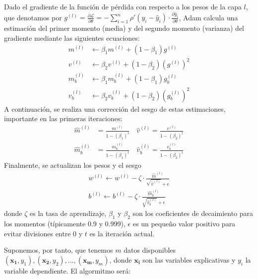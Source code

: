 \documentclass[11pt]{book}
\theoremstyle{plain} %
\theoremstyle{definition} %
\begin{document}
Dado el gradiente de la función de pérdida con respecto a los pesos de la capa $l$, que denotamos 
por $g^{(l)} = \frac{\partial \mathcal{L}}{\partial \theta}= -\sum_{i=1}^n \rho'\left(y_i - \hat{y}_i\right) \cdot \frac{\partial \hat{y}_i}{\partial \theta}$, 
Adam calcula una estimación del primer momento (media) y  del segundo momento  (varianza) del 
gradiente mediante las siguientes ecuaciones:
\begin{align*}
   m^{(l)} &\gets \beta_1 m^{(l)} + (1 - \beta_1) g^{(l)} \\
   v^{(l)} &\gets \beta_2 v^{(l)} + (1 - \beta_2) (g^{(l)})^2\\
   m_b^{(l)} &\gets \beta_1 m_b^{(l)} + (1 - \beta_1) g_b^{(l)} \\
v_b^{(l)} &\gets \beta_2 v_b^{(l)} + (1 - \beta_2) (g_b^{(l)})^2 
\end{align*}
A continuación, se realiza una corrección del sesgo de estas estimaciones, importante en las 
primeras iteraciones:
\begin{align*}
   \hat{m}^{(l)} &= \frac{m^{(l)}}{1 - (\beta_1)^t} \quad \hat{v}^{(l)} = \frac{v^{(l)}}{1 - (\beta_2)^t}\\
   \hat{m}_b^{(l)} &= \frac{m_b^{(l)}}{1 - (\beta_1)^t} \quad \hat{v}_b^{(l)} = \frac{v_b^{(l)}}{1 - (\beta_2)^t}
\end{align*}
Finalmente, se actualizan los pesos y el sesgo
\begin{align*}
   w^{(l)} \gets w^{(l)} - \zeta \cdot \frac{\hat{m}^{(l)}}{\sqrt{\hat{v}^{(l)}} + \epsilon}\\
   b^{(l)} \gets b^{(l)} - \zeta \cdot \frac{\hat{m}_b^{(l)}}{\sqrt{\hat{v}_b^{(l)}} + \epsilon}
\end{align*}
donde $\zeta$ es la tasa de aprendizaje, $\beta_1$ y $\beta_2$ son los coeficientes de
decaimiento para los momentos (típicamente 0.9 y 0.999), $\epsilon$ es un pequeño valor positivo
para evitar divisiones entre 0 y $t$ es la iteración actual.

Suponemos, por tanto, que tenemos $m$ datos disponibles 
$(\mathbf{x_1}, y_1), (\mathbf{x_2}, y_2), \dots, (\mathbf{x_m}, y_m)$, donde $\mathbf{x_i}$ 
son las variables explicativas y $y_i$ la variable dependiente. El algormitmo será:\\
\end{document}
